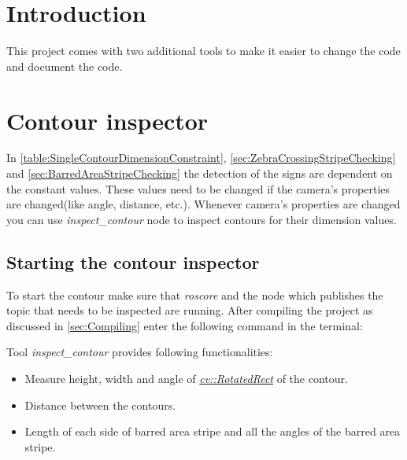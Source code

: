\section{Introduction}
This project comes with two additional tools to make it easier to change the code and document the code.

\section{Contour inspector}
In \autoref{table:SingleContourDimensionConstraint}, \autoref{sec:ZebraCrossingStripeChecking} and \autoref{sec:BarredAreaStripeChecking} the detection of the signs are dependent on the constant values. These values need to be changed if the camera's properties are changed(like angle, distance, etc.). Whenever camera's properties are changed you can use \emph{inspect\_contour} node to inspect contours for their dimension values.

\subsection{Starting the contour inspector}
To start the contour make sure that \emph{roscore} and the node which publishes the topic that needs to be inspected are running. After compiling the project as discussed in \autoref{sec:Compiling} enter the following command in the terminal:

Tool \emph{inspect\_contour} provides following functionalities:
\begin{itemize}
    \item Measure height, width and angle of \href{https://docs.opencv.org/3.4.3/db/dd6/classcv_1_1RotatedRect.html}{\emph{cv::RotatedRect}} of the contour.
    \item Distance between the contours.
    \item Length of each side of barred area stripe and all the angles of the barred area stripe.
\end{itemize}

